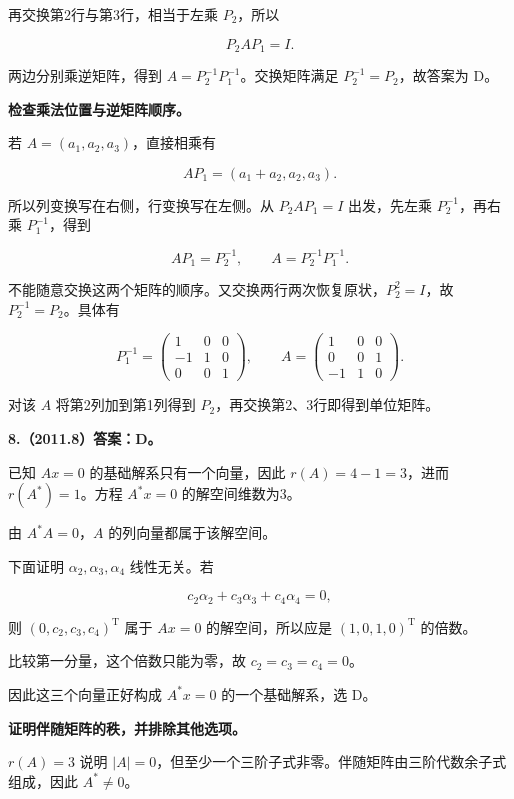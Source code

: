 \documentclass[UTF8,11pt,fontset=windows]{ctexart}
\begin{document}
再交换第2行与第3行，相当于左乘 $P_2$，所以

$$
P_2AP_1=I.
$$

两边分别乘逆矩阵，得到 $A=P_2^{-1}P_1^{-1}$。交换矩阵满足 $P_2^{-1}=P_2$，故答案为 D。

\textbf{检查乘法位置与逆矩阵顺序。}

若 $A=(a_1,a_2,a_3)$，直接相乘有

$$
AP_1=(a_1+a_2,a_2,a_3).
$$

所以列变换写在右侧，行变换写在左侧。从 $P_2AP_1=I$ 出发，先左乘 $P_2^{-1}$，再右乘 $P_1^{-1}$，得到

$$
AP_1=P_2^{-1},\qquad A=P_2^{-1}P_1^{-1}.
$$

不能随意交换这两个矩阵的顺序。又交换两行两次恢复原状，$P_2^2=I$，故 $P_2^{-1}=P_2$。具体有

$$
P_1^{-1}=\begin{pmatrix}1&0&0\\-1&1&0\\0&0&1\end{pmatrix},
\qquad
A=\begin{pmatrix}1&0&0\\0&0&1\\-1&1&0\end{pmatrix}.
$$

对该 $A$ 将第2列加到第1列得到 $P_2$，再交换第2、3行即得到单位矩阵。

\clearpage

\textbf{8.（2011.8）答案：D。}

已知 $Ax=0$ 的基础解系只有一个向量，因此 $r(A)=4-1=3$，进而 $r(A^*)=1$。方程 $A^*x=0$ 的解空间维数为3。

由 $A^*A=0$，$A$ 的列向量都属于该解空间。

下面证明 $\alpha_2,\alpha_3,\alpha_4$ 线性无关。若

$$
c_2\alpha_2+c_3\alpha_3+c_4\alpha_4=0,
$$

则 $(0,c_2,c_3,c_4)^{\mathrm T}$ 属于 $Ax=0$ 的解空间，所以应是 $(1,0,1,0)^{\mathrm T}$ 的倍数。

比较第一分量，这个倍数只能为零，故 $c_2=c_3=c_4=0$。

因此这三个向量正好构成 $A^*x=0$ 的一个基础解系，选 D。

\textbf{证明伴随矩阵的秩，并排除其他选项。}

$r(A)=3$ 说明 $|A|=0$，但至少一个三阶子式非零。伴随矩阵由三阶代数余子式组成，因此 $A^*\ne0$。
\end{document}

